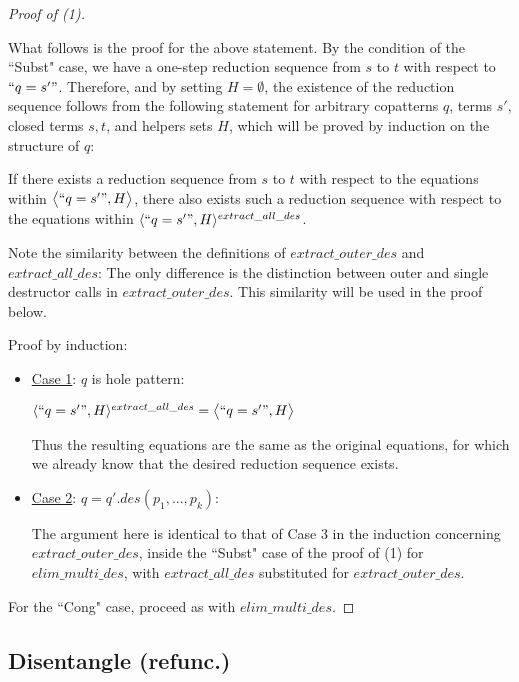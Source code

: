 \documentclass[11pt]{article} %
\begin{document}
\begin{proof}[Proof of (1)]
\begin{enumerate}
\begin{itemize}
What follows is the proof for the above statement. By the condition of the ``Subst" case, we have a one-step reduction sequence from $s$ to $t$ with respect to $`` q = s' "$. Therefore, and by setting $H = \emptyset$, the existence of the reduction sequence follows from the following statement for arbitrary copatterns $q$, terms $s'$, closed terms $s,t$, and helpers sets $H$, which will be proved by induction on the structure of $q$:

If there exists a reduction sequence from $s$ to $t$ with respect to the equations within $\big\langle `` q = s' ", H \big\rangle$, there also exists such a reduction sequence with respect to the equations within $\langle `` q = s' ", H \rangle^{extract\_all\_des}$.

Note the similarity between the definitions of $extract\_outer\_des$ and $extract\_all\_des$: The only difference is the distinction between outer and single destructor calls in $extract\_outer\_des$. This similarity will be used in the proof below.

Proof by induction:

\begin{itemize}

\item \underline{Case 1}: $q$ is hole pattern:

$\langle `` q = s' ", H \rangle^{extract\_all\_des} = \big\langle `` q = s' ", H \big\rangle$

Thus the resulting equations are the same as the original equations, for which we already know that the desired reduction sequence exists.

\item \underline{Case 2}: $q = q'.des(p_1, ..., p_k)$:

The argument here is identical to that of Case 3 in the induction concerning $extract\_outer\_des$, inside the ``Subst" case of the proof of (1) for $elim\_multi\_des$, with $extract\_all\_des$ substituted for $extract\_outer\_des$.

\end{itemize}

\end{itemize}

\end{enumerate}

For the ``Cong" case, proceed as with $elim\_multi\_des$.

\end{proof}

\subsection{Disentangle (refunc.)}
\end{document}
